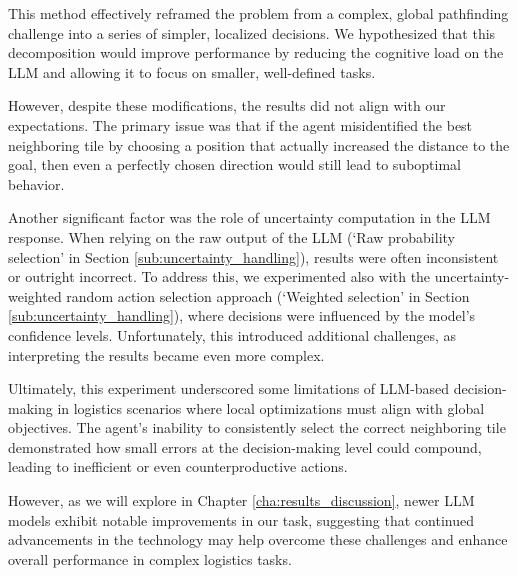 This method effectively reframed the problem from a complex, global pathfinding challenge
into a series of simpler, localized decisions. We hypothesized that this decomposition
would improve performance by reducing the cognitive load on the LLM and allowing
it to focus on smaller, well-defined tasks.

However, despite these modifications, the results did not align with our
expectations. The primary issue was that if the agent misidentified the best neighboring
tile by choosing a position that actually increased the distance to the goal,
then even a perfectly chosen direction would still lead to suboptimal behavior.

Another significant factor was the role of uncertainty computation in the LLM
response. When relying on the raw output of the LLM (`Raw probability selection'
in Section \ref{sub:uncertainty_handling}), results were often inconsistent or
outright incorrect. To address this, we experimented also with the uncertainty-weighted
random action selection approach (`Weighted selection' in Section \ref{sub:uncertainty_handling}),
where decisions were influenced by the model's confidence levels. Unfortunately,
this introduced additional challenges, as interpreting the results became even
more complex.

Ultimately, this experiment underscored some limitations of LLM-based decision-making
in logistics scenarios where local optimizations must align with global objectives.
The agent's inability to consistently select the correct neighboring tile
demonstrated how small errors at the decision-making level could compound, leading
to inefficient or even counterproductive actions.

However, as we will explore in Chapter \ref{cha:results_discussion}, newer LLM models
exhibit notable improvements in our task, suggesting that continued advancements
in the technology may help overcome these challenges and enhance overall
performance in complex logistics tasks.